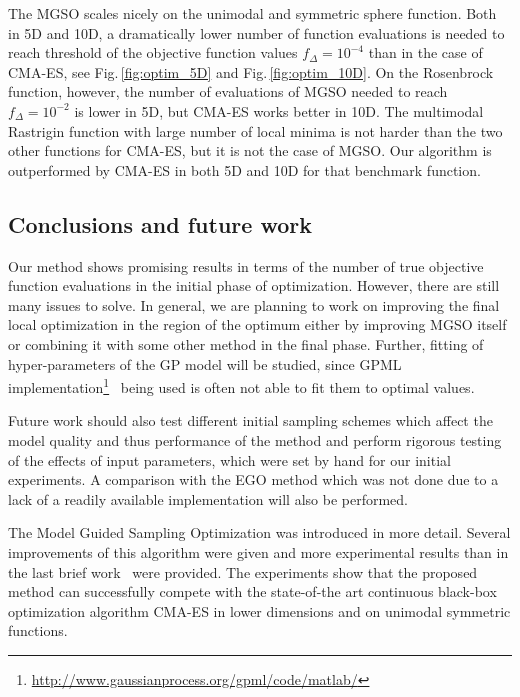 \documentclass{itatnew}
\begin{document}
The MGSO scales nicely on the unimodal and symmetric sphere function. Both in 5D and 10D, a dramatically lower number of function evaluations is needed to reach threshold of the objective function values $f_{\Delta} = 10^{-4}$ than in the case of CMA-ES, see Fig.\,\ref{fig:optim_5D} and Fig.\,\ref{fig:optim_10D}. On the Rosenbrock function, however, the number of evaluations of MGSO needed to reach $f_{\Delta} = 10^{-2}$ is lower in 5D, but CMA-ES works better in 10D. The multimodal Rastrigin function with large number of local minima is not harder than the two other functions for CMA-ES, but it is not the case of MGSO. Our algorithm is outperformed by CMA-ES in both 5D and 10D for that benchmark function.


\subsection{Conclusions and future work}

Our method shows promising results in terms of the number of true objective function evaluations in the initial phase of optimization. However, there are still many issues to solve. In general, we are planning to work on improving the final local optimization in the region of the optimum either by improving MGSO itself or combining it with some other method in the final phase. Further, fitting of hyper-parameters of the GP model will be studied, since GPML implementation\footnote{\url{http://www.gaussianprocess.org/gpml/code/matlab/}}~\cite{rasmussen_gaussian_2010} being used is often not able to fit them to optimal values.

Future work should also test different initial sampling schemes which affect the model quality and thus performance of the method and perform rigorous testing of the effects of input parameters, which were set by hand for our initial experiments. A comparison with the EGO method which was not done due to a lack of a readily available implementation will also be performed. 

The Model Guided Sampling Optimization was introduced in more detail. Several improvements of this algorithm were given and more experimental results than in the last brief work~\cite{bajer_model_2013} were provided. The experiments show that the proposed method can successfully compete with the state-of-the art continuous black-box optimization algorithm CMA-ES in lower dimensions and on unimodal symmetric functions.
\end{document}
